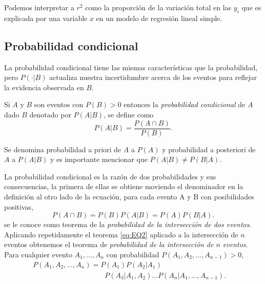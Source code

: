 \documentclass[letterpaper]{article}
\begin{document}
Podemos interpretar a $r^2$ como la proporción de la variación total en las $y_i$  que es explicada por una variable $x$ en un modelo de regresión lineal simple.

\subsection {Probabilidad condicional}
La probabilidad condicional tiene las mismas características que la probabilidad, pero $P(\cdot|B)$ actualiza nuestra incertidumbre acerca de los eventos para reflejar la evidencia observada en $B$.

Si $A$ y $B$ son eventos con $P(B)>0$ entonces la \emph{probabilidad condicional} de $A$ dado $B$ denotado por $P(A|B)$, se define como
\begin{equation}
P(A|B)=\frac{P(A\cap B)}{P(B)}.
\end{equation}

Se denomina probabilidad a priori de $A$ a $P(A)$ y probabilidad a posteriori de $A$ a $P(A|B)$ y es importante mencionar que $P(A|B) \neq P(B|A)$.

La probabilidad condicional es la razón de dos probabilidades y sus consecuencias, la primera de ellas se obtiene moviendo el denominador en la definición al otro lado de la ecuación, para cada evento {A} y {B} con posibilidades positivas,
\begin{equation}\label{eq:EQ2}
P(A\cap B)=P(B)P(A|B)=P(A)P(B|A).
\end{equation}
se le conoce como teorema de la \emph{probabilidad de la intersección de dos eventos}. Aplicando repetidamente el teorema \eqref{eq:EQ2} aplicado a la intersección de $n$ eventos obtenemos el teorema de \emph{probabilidad de la intersección de $n$ eventos}. Para cualquier evento $A_1,\ldots,A_n$ con probabilidad $P(A_1,A_2,\ldots,A_{n-1})>0$,
\begin{equation}
\begin{matrix}
P(A_1,A_2,\ldots,A_n)=P(A_1)P(A_2|A_1) \qquad \qquad \qquad \qquad \qquad \\
\qquad  \qquad \qquad \qquad \qquad P(A_3|A_1,A_2)\ldots P(A_n|A_1,\ldots,A_{n-1}).\end{matrix}
\end{equation}
\end{document}
